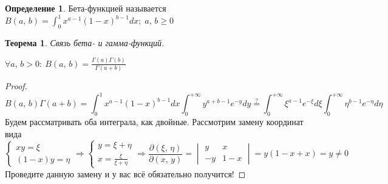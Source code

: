\documentclass[a4paper,12pt]{article}
\renewcommand{\geq}{\ensuremath{\geqslant}}
\theoremstyle{plain}
\newtheorem{theorem}{Теорема}[section]
\theoremstyle{definition}
\newtheorem{definition}{Определение}[section]
\theoremstyle{remark}
\begin{document}
\begin{definition}
	Бета-функцией называется $B(a,\,b) = \int_0^1 x^{a - 1}(1 - x)^{b - 1}dx;\; a,\,b \geq 0$
\end{definition}

\begin{theorem}
	Связь бета- и гамма-функций.

	$\forall a,\,b > 0:\: B(a,\,b) = \frac{\Gamma(a)\Gamma(b)}{\Gamma(a + b)}$
\end{theorem}

\begin{proof}
	\[
		B(a,\,b)\Gamma(a + b) = \int_0^1 x^{a - 1}(1 - x)^{b - 1}dx\int_0^{+\infty} y^{a + b - 1}e^{-y}dy \stackrel{?}{=} \int_0^{+\infty}\xi^{a - 1}e^{-\xi}d\xi \int_0^{+\infty}\eta^{b - 1}e^{-\eta}d\eta
	\]
	Будем рассматривать оба интеграла, как двойные. Рассмотрим замену координат вида
	\[
		\begin{cases}
			xy = \xi \\
			(1 - x)y = \eta
		\end{cases}
		\Rightarrow
		\begin{cases}
			y = \xi + \eta \\
			x = \frac{\xi}{\xi + \eta}
		\end{cases}
		\Rightarrow
		\frac{\partial(\xi,\,\eta)}{\partial(x,\,y)} =
		\begin{vmatrix}
			y  & x     \\
			-y & 1 - x
		\end{vmatrix}
		= y(1 - x + x) = y \neq 0
	\]
	Проведите данную замену и у вас всё обязательно получится!
\end{proof}
\end{document}
